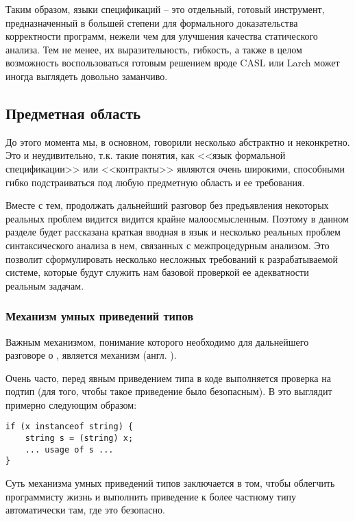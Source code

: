 Таким образом, языки спецификаций -- это отдельный, готовый инструмент, предназначенный в большей степени для формального доказательства корректности программ, нежели чем для улучшения качества статического анализа. Тем не менее, их выразительность, гибкость, а также в целом возможность воспользоваться готовым решением вроде CASL или Larch может иногда выглядеть довольно заманчиво.



\newpage



\subsection{Предметная область}

До этого момента мы, в основном, говорили несколько абстрактно и неконкретно. Это и неудивительно, т.к. такие понятия, как <<язык формальной спецификации>> или <<контракты>> являются очень широкими, способными гибко подстраиваться под любую предметную область и ее требования.

Вместе с тем, продолжать дальнейший разговор без предъявления некоторых реальных проблем видится видится крайне малоосмысленным. Поэтому в данном разделе будет рассказана краткая вводная в язык  и несколько реальных проблем синтаксического анализа в нем, связанных с межпроцедурным анализом. Это позволит сформулировать несколько несложных требований к разрабатываемой системе, которые будут служить нам базовой проверкой ее адекватности реальным задачам.


\subsubsection{Механизм умных приведений типов}

Важным механизмом, понимание которого необходимо для дальнейшего разговоре о , является механизм  (англ. ).

Очень часто, перед явным приведением типа в коде выполняется проверка на подтип (для того, чтобы такое приведение было безопасным). В  это выглядит примерно следующим образом:

\begin{verbatim}
if (x instanceof string) {
    string s = (string) x;
    ... usage of s ...
}
\end{verbatim}

Суть механизма умных приведений типов заключается в том, чтобы облегчить программисту жизнь и выполнить приведение к более частному типу автоматически там, где это безопасно.

